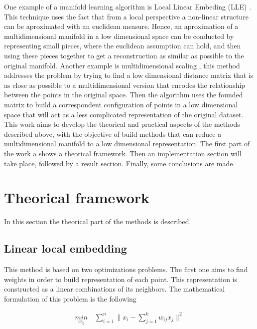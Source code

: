 \documentclass[a0,portrait]{a0poster}
\begin{document}
\begin{multicols}{3}
    One example of a manifold learning algorithm is Local Linear Embeding (LLE)
    \cite{lle}. This technique uses the fact that from a local perspective a
    non-linear structure can be aproximated with an euclidean measure. Hence, an
    aproximation of a multidimensional manifold in a low dimensional space can be
    conducted by representing small pieces, where the euclidean assumption can hold,
    and then using these pieces together to get a reconstruction as similar as
    possible to the original manifold. Another example is multidimensional
    scaling \cite{mds}, this method addresses the problem by trying to find a low
    dimensional distance matrix that is as close as possible to a multidimensional
    version that encodes the relationship between the points in the original space.
    Then the algorithm uses the founded matrix to build a correspondent configuration
    of points in a low dimensional space that will act as a less complicated
    representation of the original dataset.\\

    This work aims to develop the theorical and practical aspects of the methods
    described above, with the objective of build methods that can reduce a
    multidimensional manifold to a low dimensional representation. The first part
    of the work a shows a theorical framework. Then an implementation section will
    take place, followed by a result section. Finally, some conclusions are made.

    \section*{Theorical framework}

    In this section the theorical part of the methods is described.

    \subsection*{Linear local embedding}

    This method is based on two optimizations problems. The first one aims to
    find weights in order to build representation of each point. This
    representation is constructed as a linear combinations of its neighbors.
    The mathematical formulation of this problem is the following

        \begin{equation*}
            \begin{aligned}
               \underset{w_{ij}}{min} \quad \sum_{i=1}^n \lVert x_i - \sum_{j=1}^k w_{ij} x_j \rVert^2
            \end{aligned}
        \end{equation*}


\end{multicols}
\end{document}
